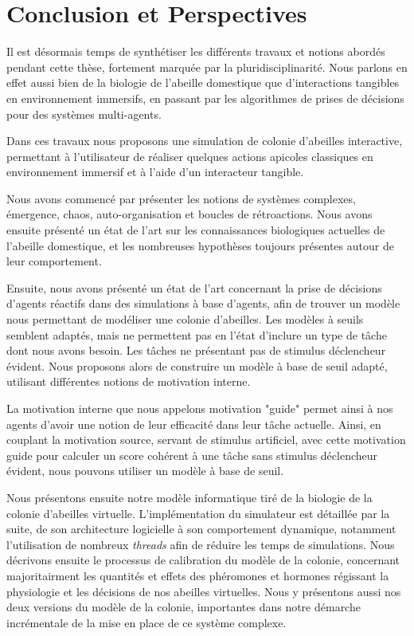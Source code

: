 \chapter*{Conclusion et Perspectives}

Il est désormais temps de synthétiser les différents travaux et notions abordés pendant cette thèse, fortement marquée par la pluridisciplinarité. Nous parlons en effet aussi bien de la biologie de l'abeille domestique que d'interactions tangibles en environnement immersifs, en passant par les algorithmes de prises de décisions pour des systèmes multi-agents.

Dans ces travaux nous proposons une simulation de colonie d'abeilles interactive, permettant à l'utilisateur de réaliser quelques actions apicoles classiques en environnement immersif et à l'aide d'un interacteur tangible.

Nous avons commencé par présenter les notions de systèmes complexes, émergence, chaos, auto-organisation et boucles de rétroactions. Nous avons ensuite présenté un état de l'art sur les connaissances biologiques actuelles de l'abeille domestique, et les nombreuses hypothèses toujours présentes autour de leur comportement.

Ensuite, nous avons présenté un état de l'art concernant la prise de décisions d'agents réactifs dans des simulations à base d'agents, afin de trouver un modèle nous permettant de modéliser une colonie d'abeilles. Les modèles à seuils semblent adaptés, mais ne permettent pas en l'état d'inclure un type de tâche dont nous avons besoin. Les tâches ne présentant pas de stimulus déclencheur évident. Nous proposons alors de construire un modèle à base de seuil adapté, utilisant différentes notions de motivation interne.

La motivation interne que nous appelons motivation "guide" permet ainsi à nos agents d'avoir une notion de leur efficacité dans leur tâche actuelle. Ainsi, en couplant la motivation source, servant de stimulus artificiel, avec cette motivation guide pour calculer un score cohérent à une tâche sans stimulus déclencheur évident, nous pouvons utiliser un modèle à base de seuil.

Nous présentons ensuite notre modèle informatique tiré de la biologie de la colonie d'abeilles virtuelle. L'implémentation du simulateur est détaillée par la suite, de son architecture logicielle à son comportement dynamique, notamment l'utilisation de nombreux \textit{threads} afin de réduire les temps de simulations. Nous décrivons ensuite le processus de calibration du modèle de la colonie, concernant majoritairment les quantités et effets des phéromones et hormones régissant la physiologie et les décisions de nos abeilles virtuelles. Nous y présentons aussi nos deux versions du modèle de la colonie, importantes dans notre démarche incrémentale de la mise en place de ce système complexe.

